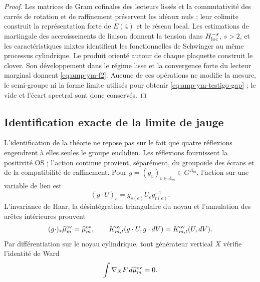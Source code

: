 \begin{proof}
Les matrices de Gram cofinales des lecteurs lissés et la commutativité des carrés de rotation et de raffinement préservent les idéaux nuls ; leur colimite construit la représentation forte de \(E(4)\) et le réseau local. Les estimations de martingale des accroissements de liaison donnent la tension dans \(H^{-s}_{\rm loc}\), \(s>2\), et les caractéristiques mixtes identifient les fonctionnelles de Schwinger au même processus cylindrique. Le produit orienté autour de chaque plaquette construit le clover. Son développement dans le régime lisse et la convergence forte du lecteur marginal donnent \eqref{eq:amp-ym-f2}. Aucune de ces opérations ne modifie la mesure, le semi-groupe ni la forme limite utilisés pour obtenir \eqref{eq:amp-ym-testigo-gap} ; le vide et l'écart spectral sont donc conservés.
\end{proof}

\subsection*{Identification exacte de la limite de jauge}

L’identification de la théorie ne repose pas sur le fait que quatre réflexions
engendrent à elles seules le groupe euclidien. Les réflexions fournissent la
positivité OS ; l’action continue provient, séparément, du groupoïde des
écrans et de la compatibilité de raffinement. Pour
\(g=(g_v)_{v\in\Lambda_m}\in G^{\Lambda_m}\), l’action sur une variable
de lien est
\begin{equation}\label{eq:amp-ym-accion-gauge-enlace}
 (g\cdot U)_e=g_{s(e)}U_e g_{t(e)}^{-1}.
\end{equation}
L’invariance de Haar, la désintégration triangulaire du noyau et
l’annulation des arêtes intérieures prouvent
\begin{equation}\label{eq:amp-ym-invariancia-gauge-medida}
 (g\cdot)_*\widehat\mu_m^{\rm ov}=\widehat\mu_m^{\rm ov},
 \qquad
 K_{m,t}^{\rm ov}(g\cdot U,g\cdot dV)
 =K_{m,t}^{\rm ov}(U,dV).
\end{equation}
Par différentiation sur le noyau cylindrique, tout générateur vertical
\(X\) vérifie l’identité de Ward
\begin{equation}\label{eq:amp-ym-ward}
 \int \nabla_XF\,d\widehat\mu_m^{\rm ov}=0.
\end{equation}

